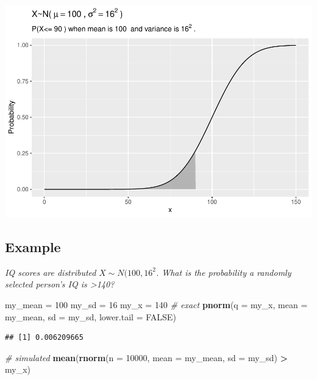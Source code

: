 \documentclass[
]{book}
\newenvironment{Shaded}{\begin{snugshade}}{\end{snugshade}}
\newcommand{\CommentTok}[1]{\textcolor[rgb]{0.56,0.35,0.01}{\textit{#1}}}
\newcommand{\DataTypeTok}[1]{\textcolor[rgb]{0.13,0.29,0.53}{#1}}
\newcommand{\DecValTok}[1]{\textcolor[rgb]{0.00,0.00,0.81}{#1}}
\newcommand{\KeywordTok}[1]{\textcolor[rgb]{0.13,0.29,0.53}{\textbf{#1}}}
\newcommand{\NormalTok}[1]{#1}
\newcommand{\OperatorTok}[1]{\textcolor[rgb]{0.81,0.36,0.00}{\textbf{#1}}}
\newcommand{\OtherTok}[1]{\textcolor[rgb]{0.56,0.35,0.01}{#1}}
\newcommand{\StringTok}[1]{\textcolor[rgb]{0.31,0.60,0.02}{#1}}
\begin{document}
\includegraphics{data-sci_files/figure-latex/unnamed-chunk-13-1.pdf}

\hypertarget{example-1}{%
\subsection{Example}\label{example-1}}

\emph{IQ scores are distributed }\(X \sim N(100, 16^2\)\emph{. What is the probability a randomly selected person's IQ is \textgreater140?}

\begin{Shaded}
\begin{Highlighting}[]
\NormalTok{my_mean =}\StringTok{ }\DecValTok{100}
\NormalTok{my_sd =}\StringTok{ }\DecValTok{16}
\NormalTok{my_x =}\StringTok{ }\DecValTok{140}
\CommentTok{# exact}
\KeywordTok{pnorm}\NormalTok{(}\DataTypeTok{q =}\NormalTok{ my_x, }\DataTypeTok{mean =}\NormalTok{ my_mean, }\DataTypeTok{sd =}\NormalTok{ my_sd, }\DataTypeTok{lower.tail =} \OtherTok{FALSE}\NormalTok{)}
\end{Highlighting}
\end{Shaded}

\begin{verbatim}
## [1] 0.006209665
\end{verbatim}

\begin{Shaded}
\begin{Highlighting}[]
\CommentTok{# simulated}
\KeywordTok{mean}\NormalTok{(}\KeywordTok{rnorm}\NormalTok{(}\DataTypeTok{n =} \DecValTok{10000}\NormalTok{, }\DataTypeTok{mean =}\NormalTok{ my_mean, }\DataTypeTok{sd =}\NormalTok{ my_sd) }\OperatorTok{>}\StringTok{ }\NormalTok{my_x)}
\end{Highlighting}
\end{Shaded}
\end{document}
